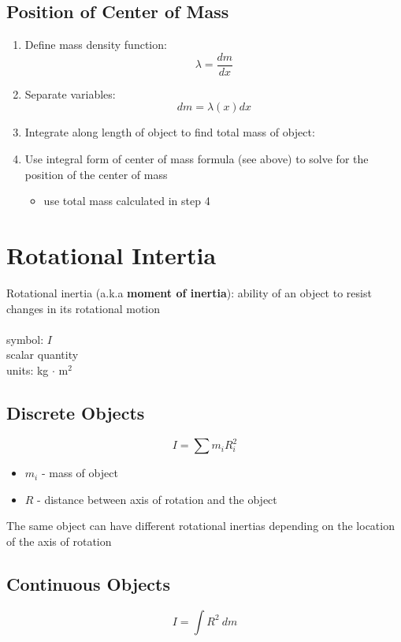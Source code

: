 \documentclass[titlepage]{article}
\begin{document}
\subsection{Position of Center of Mass}
\begin{enumerate}
    \item Define mass density function: \[\lambda = \frac{dm}{dx}\]
    \item Separate variables: \[dm = \lambda(x) dx\]
    \item Integrate along length of object to find total mass of object:
    \item Use integral form of center of mass formula (see above) to solve for the position of the center of mass
          \begin{itemize}
              \item use total mass calculated in step 4
          \end{itemize}
\end{enumerate}

\section{Rotational Intertia}
Rotational inertia (a.k.a \textbf{moment of inertia}): ability of an object to resist changes in its rotational motion\\ \\
symbol: $I$\\
scalar quantity\\
units: kg $\cdot$ m$^2$

\subsection{Discrete Objects}
\begin{equation*}
    I = \sum m_i R_i^2
\end{equation*}

\begin{itemize}
    \item $m_i$ - mass of object
    \item $R$ - distance between axis of rotation and the object
\end{itemize}

The same object can have different rotational inertias depending on the location of the axis of rotation

\subsection{Continuous Objects}
\begin{equation*}
    I = \int R^2 \ dm
\end{equation*}
\end{document}
